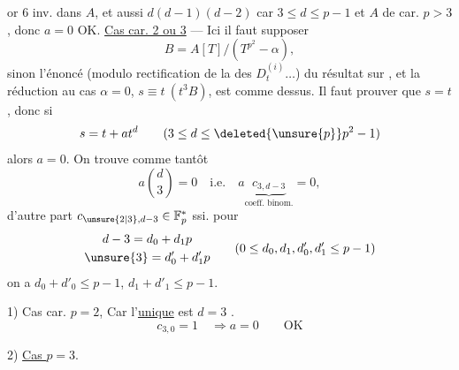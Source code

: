 or 6 inv. dans $A$, et aussi $d(d-1)(d-2)$ car $3\le d\le p-1$ et $A$ de car. $p>3$, donc $a=0$ OK.
\uline{Cas car. 2 ou 3} --- Ici il faut supposer
\[ B=A[T]/(T^{p^2}-\alpha), \]
sinon l'énoncé (modulo rectification de la  des $D_t^{(i)}\ldots$) du résultat sur , et la réduction au cas $\alpha=0$, $s\equiv t\ (t^3B)$, est comme dessus. Il faut prouver que $s=t$, donc si
\[s=t+at^d\qquad(3\leq d\leq\deleted{\unsure{p}}p^2-1)\]
alors $a=0$. On trouve comme tantôt
\[a\binom d3=0\quad\text{i.e.}\quad a\underbrace{c_{3,d-3}}_{\text{coeff. binom.}}=0,\]
d'autre part $c_{\unsure{2|3},d-3}\in\mathbb F_p^*$ ssi.  pour
\[
\begin{gathered}
d-3=d_0+d_1p\\
\unsure{3}=d'_0+d'_1p
\end{gathered}
\qquad(0\leq d_0,d_1,d'_0,d'_1\leq p-1)
\]
on a $d_0+d'_0\leq p-1$, $d_1+d'_1\leq p-1$.

1) Cas car. $p=2$, 
Car l'\uline{unique} est $d=3$ .
\[c_{3,0}=1\quad\Longrightarrow a=0\qquad\text{OK}\]

2) \uline{Cas $p=3$}. 


